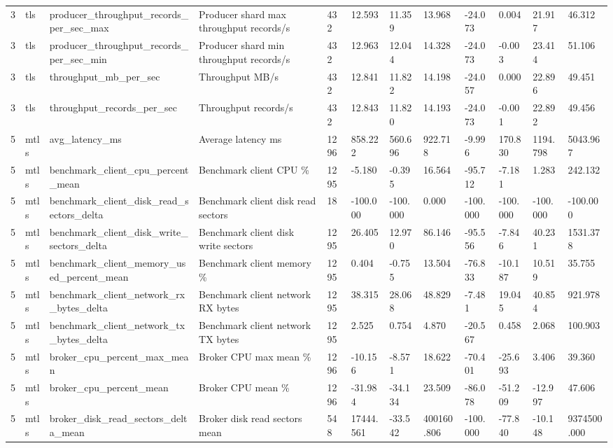 \begin{longtable}{llllllllllll}
3 & tls & producer\_throughput\_records\_per\_sec\_max & Producer shard max throughput records/s & 432 & 12.593 & 11.359 & 13.968 & -24.073 & 0.004 & 21.917 & 46.312 \\
3 & tls & producer\_throughput\_records\_per\_sec\_min & Producer shard min throughput records/s & 432 & 12.963 & 12.044 & 14.328 & -24.073 & -0.003 & 23.414 & 51.106 \\
3 & tls & throughput\_mb\_per\_sec & Throughput MB/s & 432 & 12.841 & 11.822 & 14.198 & -24.057 & 0.000 & 22.896 & 49.451 \\
3 & tls & throughput\_records\_per\_sec & Throughput records/s & 432 & 12.843 & 11.820 & 14.193 & -24.073 & -0.001 & 22.892 & 49.456 \\
5 & mtls & avg\_latency\_ms & Average latency ms & 1296 & 858.222 & 560.696 & 922.718 & -9.996 & 170.830 & 1194.798 & 5043.967 \\
5 & mtls & benchmark\_client\_cpu\_percent\_mean & Benchmark client CPU \% & 1295 & -5.180 & -0.395 & 16.564 & -95.712 & -7.181 & 1.283 & 242.132 \\
5 & mtls & benchmark\_client\_disk\_read\_sectors\_delta & Benchmark client disk read sectors & 18 & -100.000 & -100.000 & 0.000 & -100.000 & -100.000 & -100.000 & -100.000 \\
5 & mtls & benchmark\_client\_disk\_write\_sectors\_delta & Benchmark client disk write sectors & 1295 & 26.405 & 12.970 & 86.146 & -95.556 & -7.846 & 40.231 & 1531.378 \\
5 & mtls & benchmark\_client\_memory\_used\_percent\_mean & Benchmark client memory \% & 1295 & 0.404 & -0.755 & 13.504 & -76.833 & -10.187 & 10.519 & 35.755 \\
5 & mtls & benchmark\_client\_network\_rx\_bytes\_delta & Benchmark client network RX bytes & 1295 & 38.315 & 28.068 & 48.829 & -7.481 & 19.045 & 40.854 & 921.978 \\
5 & mtls & benchmark\_client\_network\_tx\_bytes\_delta & Benchmark client network TX bytes & 1295 & 2.525 & 0.754 & 4.870 & -20.567 & 0.458 & 2.068 & 100.903 \\
5 & mtls & broker\_cpu\_percent\_max\_mean & Broker CPU max mean \% & 1296 & -10.156 & -8.571 & 18.622 & -70.401 & -25.693 & 3.406 & 39.360 \\
5 & mtls & broker\_cpu\_percent\_mean & Broker CPU mean \% & 1296 & -31.984 & -34.134 & 23.509 & -86.078 & -51.209 & -12.997 & 47.606 \\
5 & mtls & broker\_disk\_read\_sectors\_delta\_mean & Broker disk read sectors mean & 548 & 17444.561 & -33.542 & 400160.806 & -100.000 & -77.840 & -10.148 & 9374500.000 \\

\end{longtable}

